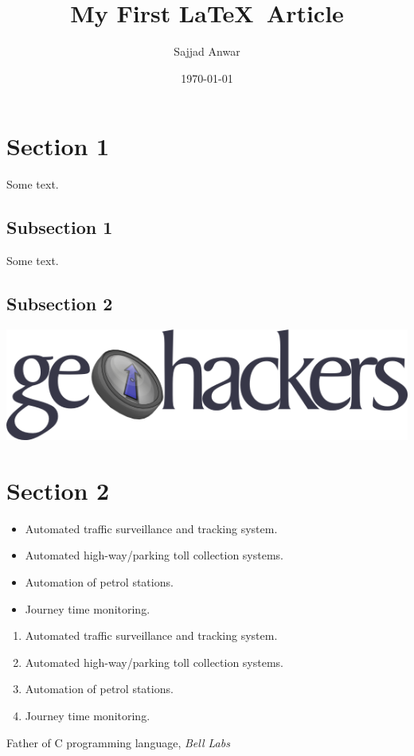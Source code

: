 \documentclass{article}
\title{My First \LaTeX\ Article}
\author{Sajjad Anwar}
\date{\today}
\begin{document}
\maketitle
\newpage
\tableofcontents
\newpage
\section{Section 1}
Some text.
\subsection{Subsection 1}
Some text.\cite{dennis}
\subsection*{Subsection 2}
\includegraphics{logo.png}
\section{Section 2}

\begin{itemize}
 \item Automated traffic surveillance and tracking system.
 \item Automated high-way/parking toll collection systems.
 \item Automation of petrol stations.
 \item Journey time monitoring.
\end{itemize}


\begin{enumerate}
 \item Automated traffic surveillance and tracking system.
 \item Automated high-way/parking toll collection systems.
 \item Automation of petrol stations.
 \item Journey time monitoring.
\end{enumerate}

\newpage
\begin{thebibliography}{Dennis, 1993}
Father of C programming language,
\emph{Bell Labs}
\end{thebibliography}
\end{document}
